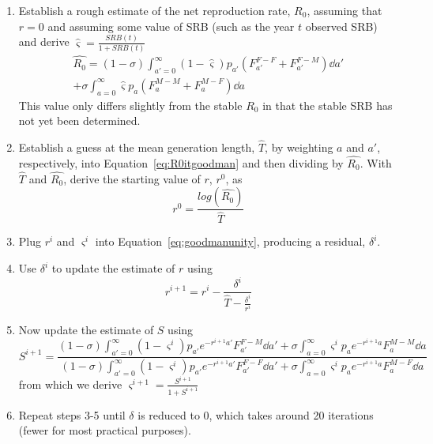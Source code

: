 \begin{enumerate}
  \item Establish a rough estimate of the net reproduction rate, $R_0$, assuming
  that $r = 0$ and assuming some value of SRB (such as the year $t$ observed
  SRB) and derive $\hat{\varsigma} = \frac{SRB(t)}{1 + SRB(t)}$
  \begin{equation}
  \label{eq:R0itgoodman}
  \begin{split}
\widehat{R_0} = (1-\sigma) \int_{a'=0}^\infty (1-\hat{\varsigma})
p_{a'}(F_{a'}^{F-F}+F_{a'}^{F-M}) \dd a' \\ + \sigma  \int_{a=0}^\infty
\hat{\varsigma} p_a(F_a^{M-M}+F_a^{M-F}) \dd a
\end{split}
  \end{equation}
  This value only differs slightly from the stable $R_0$ in that the stable SRB
  has not yet been determined.
  \item Establish a guess at the mean generation length, $\widehat{T}$, by
  weighting $a$ and $a'$, respectively, into Equation~\eqref{eq:R0itgoodman} and
  then dividing by $\widehat{R_0}$. With $\widehat{T}$ and $\widehat{R_0}$,
  derive the starting value of $r$, $r^{0}$, as
  \begin{equation}
  r^{0} = \frac{log(\widehat{R_0})}{\widehat{T}}
  \end{equation}
  \item Plug $r^{i}$ and $\varsigma^i$ into
  Equation~\eqref{eq:goodmanunity}, producing a residual, $\delta^{i}$.
  \item Use $\delta^{i}$ to update the estimate of $r$ using
   \begin{equation}
  r^{i+1} = r^i - \frac{\delta^i}{\widehat{T} - \frac{\delta^i}{r^i}}
  \end{equation}
  \item Now update the estimate of $S$ using
   \begin{equation}
        S^{i+1} = \frac{(1-\sigma) \int_{a'=0}^\infty
         (1-\varsigma^i)p_{a'}e^{-r^{i+1}a'} F_{a'}^{F-M} \dd a' + 
         \sigma  \int_{a=0}^\infty \varsigma^i p_ae^{-r^{i+1}a} F_a^{M-M} \dd
         a}{ (1-\sigma) \int_{a'=0}^\infty
         (1-\varsigma^i)p_{a'}e^{-r^{i+1}a'} F_{a'}^{F-F} \dd a' + 
         \sigma  \int_{a=0}^\infty \varsigma^i p_ae^{-r^{i+1}a} F_a^{M-F} \dd a}
  \end{equation}
  from which we derive $\varsigma^{i+1} = \frac{S^{i+1}}{1+S^{i+1}}$
  \item Repeat steps 3-5 until $\delta$ is reduced to 0, which takes around 20
  iterations (fewer for most practical purposes).
\end{enumerate}

